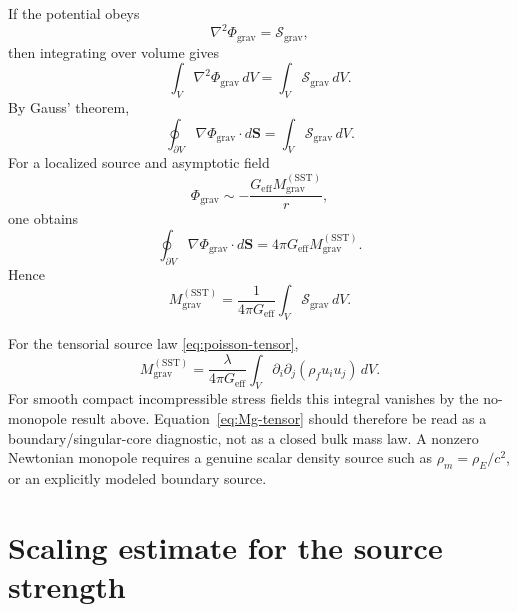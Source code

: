 \documentclass[11pt]{article}
\newcommand{\rhoF}{\rho_{\!f}}
\newcommand{\rhoE}{\rho_{\!E}}
\newcommand{\rhoM}{\rho_{\!m}}
\newcommand{\eff}{\mathrm{eff}}
\newcommand{\SST}{\mathrm{SST}}
\newcommand{\grav}{\mathrm{grav}}
\begin{document}
        If the potential obeys
        \[
            \nabla^2 \Phi_{\grav} = \mathcal{S}_{\grav},
        \]
        then integrating over volume gives
        \begin{equation}
            \int_V \nabla^2\Phi_{\grav}\,dV
            =
            \int_V \mathcal{S}_{\grav}\,dV.
            \label{eq:int-poisson}
        \end{equation}
        By Gauss' theorem,
        \begin{equation}
            \oint_{\partial V} \nabla\Phi_{\grav}\cdot d\mathbf{S}
            =
            \int_V \mathcal{S}_{\grav}\,dV.
            \label{eq:gauss-phi}
        \end{equation}
        For a localized source and asymptotic field
        \[
            \Phi_{\grav}\sim -\frac{G_{\eff} M_{\grav}^{(\SST)}}{r},
        \]
        one obtains
        \begin{equation}
            \oint_{\partial V} \nabla\Phi_{\grav}\cdot d\mathbf{S}
            =
            4\pi G_{\eff} M_{\grav}^{(\SST)}.
            \label{eq:gauss-mass}
        \end{equation}
        Hence
        \begin{equation}
            \boxed{
                M_{\grav}^{(\SST)}
                =
                \frac{1}{4\pi G_{\eff}}
                \int_V \mathcal{S}_{\grav}\,dV.
            }
            \label{eq:Mg-general}
        \end{equation}
        
        For the tensorial source law \eqref{eq:poisson-tensor},
        \begin{equation}
            \boxed{
                M_{\grav}^{(\SST)}
                =
                \frac{\lambda}{4\pi G_{\eff}}
                \int_V \partial_i\partial_j(\rhoF u_i u_j)\,dV.
            }
            \label{eq:Mg-tensor}
        \end{equation}
        For smooth compact incompressible stress fields this integral vanishes by the no-monopole result above.  Equation~\eqref{eq:Mg-tensor} should therefore be read as a boundary/singular-core diagnostic, not as a closed bulk mass law.  A nonzero Newtonian monopole requires a genuine scalar density source such as \(\rhoM=\rhoE/c^2\), or an explicitly modeled boundary source.
        
        \section{Scaling estimate for the source strength}
        
\end{document}
